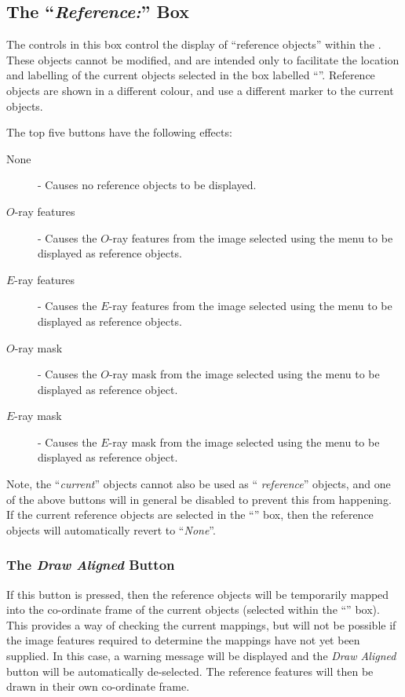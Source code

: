 \subsection {The ``{\em Reference:}'' Box}
The controls in this box control the display of ``reference objects''
within the . These
objects cannot be modified, and are intended only to facilitate the location
and labelling of the current objects selected in the box labelled 
``''. Reference objects are
shown in a different colour, and use a different marker to the current
objects.

The top five buttons have the following effects:

\begin{description}

\item [None] - Causes no reference objects to be displayed.

\item [$O$-ray features] - Causes the $O$-ray features from the image
selected using the  menu to
be displayed as reference objects.

\item [$E$-ray features] - Causes the $E$-ray features from the image
selected using the  menu to
be displayed as reference objects.

\item [$O$-ray mask] - Causes the $O$-ray mask from the image
selected using the  menu to
be displayed as reference object.

\item [$E$-ray mask] - Causes the $E$-ray mask from the image
selected using the  menu to
be displayed as reference object.

\end{description}

Note, the ``{\em current}'' objects cannot also be used as ``{\em
reference}'' objects, and one of the above buttons will in general be
disabled to prevent this from happening. If the current reference objects are
selected in the ``'' box, then the 
reference objects will automatically revert to ``{\em None}''.

\subsubsection {The {\em Draw Aligned} Button}
If this button is pressed, then the reference objects will be temporarily
mapped into the co-ordinate frame of the current objects (selected within
the ``'' box). This provides a
way of checking the current mappings, but will not be possible if the
image features required to determine the mappings have not yet been
supplied. In this case, a warning message will be displayed and the {\em
Draw Aligned} button will be automatically de-selected. The reference
features will then be drawn in their own co-ordinate frame.

